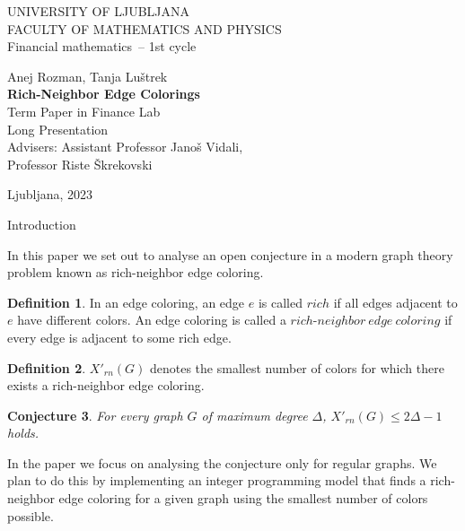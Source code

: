 \documentclass[12pt,a4paper]{amsart}
\makeatletter
\renewcommand\section{\@startsection{section}{1}
  \z@{.5\linespacing\@plus.7\linespacing}{.5\linespacing}
  {\normalfont\scshape\large\centering}}
\theoremstyle{definition} %
\newtheorem{definicija}{Definition}[section]
\theoremstyle{plain} %
\newtheorem{conjecture}[definicija]{Conjecture}
\newcommand{\program}{Financial mathematics} %
\newcommand{\imeavtorja}{Anej Rozman, Tanja Luštrek} %
\newcommand{\imementorja}{Assistant Professor Janoš Vidali} %
\newcommand{\imesomentorja}{Professor Riste Škrekovski}
\newcommand{\naslovdela}{Rich-Neighbor Edge Colorings}
\newcommand{\letnica}{2023} %
\makeatother
\begin{document}
\thispagestyle{empty}
{\large
\noindent UNIVERSITY OF LJUBLJANA\\[1mm]
FACULTY OF MATHEMATICS AND PHYSICS\\[5mm]
\program\ -- 1st cycle}
\vfill

\begin{center}{\large
\imeavtorja\\[2mm]
{\bf \naslovdela}\\[10mm]
Term Paper in Finance Lab\\[2mm]
Long Presentation\\[1cm]
Advisers: \imementorja, \\ \imesomentorja\\[2mm]}
\end{center}
\vfill

{\large
Ljubljana, \letnica}
\pagebreak

\thispagestyle{empty}
\tableofcontents
\pagebreak

\section{Introduction}

    In this paper we set out to analyse an open conjecture in a modern graph theory problem known as rich-neighbor edge coloring.

    \begin{definicija}
        In an edge coloring, an edge $e$ is called $rich$ if all edges adjacent to $e$ have different colors. An edge coloring is 
        called a $rich\text{-}neighbor \ edge \ coloring$ if every edge is adjacent to some rich edge.
    \end{definicija}

    \begin{definicija}
        $X'_{rn}(G)$ denotes the smallest number of colors for which there exists a rich-neighbor edge coloring.
    \end{definicija}

    \begin{conjecture}
        For every graph $G$ of maximum degree $\Delta$, $X'_{rn}(G) \leq 2\Delta - 1$ holds.
    \end{conjecture}

    In the paper we focus on analysing the conjecture only for regular graphs. We plan to do this by implementing an integer programming model that finds a rich-neighbor edge coloring for a given graph using the smallest number of colors possible.
\end{document}
